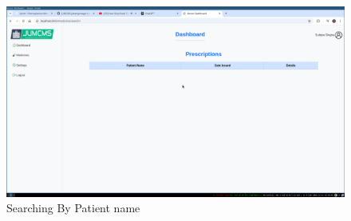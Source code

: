 \documentclass[a4paper,12pt]{article}
\begin{document}
\begin{figure}[H]
    \centering
    \includegraphics[width=\textwidth]{spr1output4.png}
    \caption{Searching By Patient name}
\end{figure}
\end{document}
